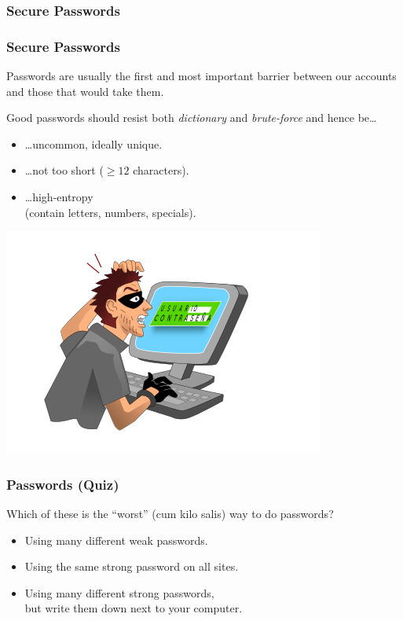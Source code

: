 \documentclass[aspectratio=169,dvipsnames]{beamer}
\begin{document}
\subsubsection{Secure Passwords}

\begin{frame}
\frametitle{Secure Passwords}
\begin{minipage}{0.5\textwidth}
Passwords are usually the first and most important barrier between our accounts and those that would take them.
\bigskip

Good passwords should resist both \emph{dictionary} and \emph{brute-force}
and hence be\dots 
\medskip

\begin{itemize}
\item\dots uncommon, ideally unique.
\item\dots not too short ($\geq 12$ characters).
\item\dots high-entropy\\ (contain letters, numbers, specials).
\end{itemize}
\end{minipage}%
\begin{minipage}{0.5\textwidth}
\begin{center}
\includegraphics[scale=0.6]{images/hacker.png} 
\end{center}
\end{minipage}
\end{frame}


\begin{frame}
\frametitle{Passwords (Quiz)}

Which of these is the ``worst'' (cum kilo salis) way to do passwords?
\bigskip

\begin{itemize}
\item Using many different weak passwords.
\item Using the same strong password on all sites.
\item Using many different strong passwords,\\ but write them down next to your computer.
\end{itemize}

\end{frame}
\end{document}
